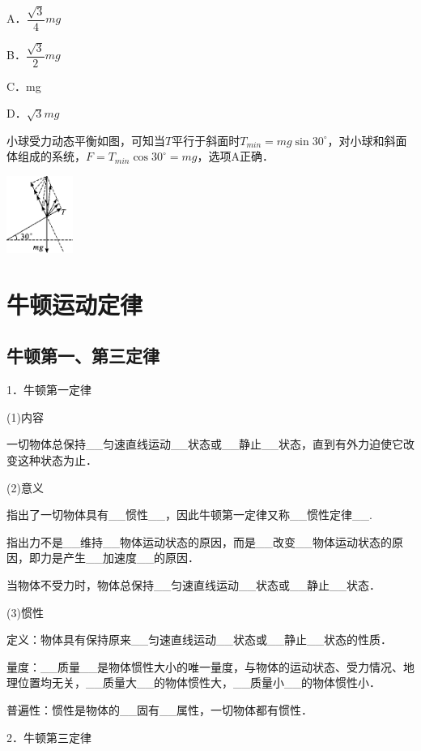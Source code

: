 \documentclass[cn,10.5pt,chinese,mac,chinesefont=founder]{elegantbook}
\begin{document}
A．$\dfrac{\sqrt{3}}{4} mg$ 

B．$\dfrac{\sqrt{3}}{2} mg$

C．mg 

D．$\sqrt{3} mg$
\begin{solution}
	小球受力动态平衡如图，可知当$T$平行于斜面时$T_{min}=mg\sin 30^\circ$，对小球和斜面体组成的系统，$F=T_{min}\cos 30^\circ=mg$，选项A正确．

\begin{center}\includegraphics[width=0.85417in,height=0.98958in]{media/image88.png}\end{center}
\end{solution}

\chapter{牛顿运动定律}
\section{牛顿第一、第三定律}


1．牛顿第一定律

(1)内容

一切物体总保持\_\_匀速直线运动\_\_状态或\_\_静止\_\_状态，直到有外力迫使它改变这种状态为止．

(2)意义

指出了一切物体具有\_\_惯性\_\_，因此牛顿第一定律又称\_\_惯性定律\_\_.

指出力不是\_\_维持\_\_物体运动状态的原因，而是\_\_改变\_\_物体运动状态的原因，即力是产生\_\_加速度\_\_的原因．

当物体不受力时，物体总保持\_\_匀速直线运动\_\_状态或\_\_静止\_\_状态．

(3)惯性

定义：物体具有保持原来\_\_匀速直线运动\_\_状态或\_\_静止\_\_状态的性质．

量度：\_\_质量\_\_是物体惯性大小的唯一量度，与物体的运动状态、受力情况、地理位置均无关，\_\_质量大\_\_的物体惯性大，\_\_质量小\_\_的物体惯性小．

普遍性：惯性是物体的\_\_固有\_\_属性，一切物体都有惯性．

2．牛顿第三定律
\end{document}
